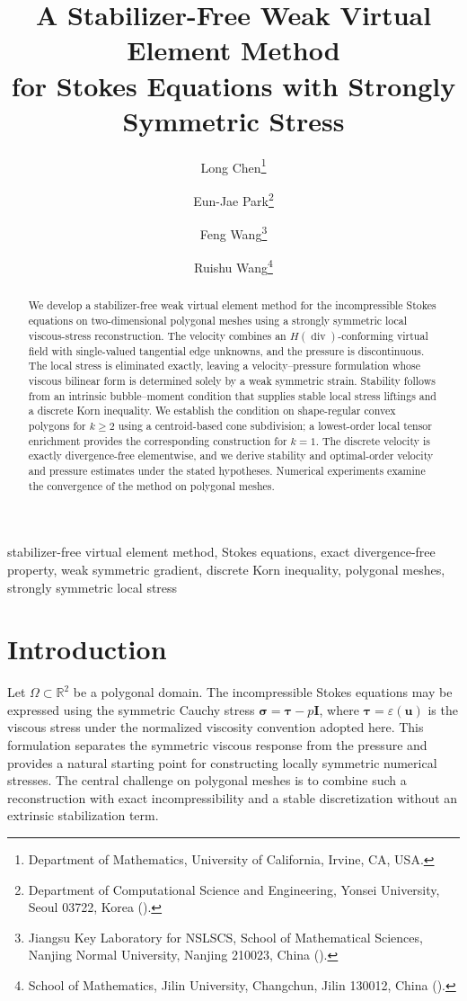 \documentclass[review,hidelinks,onefignum,onetabnum]{siamart251216}
\title{A Stabilizer-Free Weak Virtual Element Method\\
for Stokes Equations with Strongly Symmetric Stress}
\author{Long Chen\thanks{Department of Mathematics, University of California, Irvine, CA, USA.}
\and Eun-Jae Park\thanks{Department of Computational Science and Engineering,
           Yonsei University,
           Seoul 03722, Korea
  (\email{ejpark@yonsei.ac.kr}).}
\and Feng Wang\thanks{Jiangsu Key Laboratory for NSLSCS,
School of Mathematical Sciences, Nanjing Normal University,
Nanjing 210023, China
  (\email{fengwang@live.cn}).}
\and Ruishu Wang\thanks{School of Mathematics,
Jilin University,
Changchun, Jilin 130012, China
  (\email{wangrs\_math@jlu.edu.cn}).}
}
\begin{document}
\maketitle




\begin{abstract}
We develop a stabilizer-free weak virtual element method for the
incompressible Stokes equations on two-dimensional polygonal meshes using
a strongly symmetric local viscous-stress reconstruction. The velocity
combines an $H(\operatorname{div})$-conforming virtual field with
single-valued tangential edge unknowns, and the pressure is discontinuous.
The local stress is eliminated exactly, leaving a velocity--pressure
formulation whose viscous bilinear form is determined solely by a weak
symmetric strain. Stability follows from an intrinsic bubble--moment
condition that supplies stable local stress liftings and a discrete Korn
inequality. We establish the condition on shape-regular convex polygons
for $k\ge2$ using a centroid-based cone subdivision; a lowest-order
local tensor enrichment provides the corresponding construction for
$k=1$. The discrete velocity is exactly divergence-free elementwise,
and we derive stability and optimal-order velocity and pressure estimates
under the stated hypotheses. Numerical experiments examine the
convergence of the method on polygonal meshes.
\end{abstract}

\begin{keywords}
stabilizer-free virtual element method, Stokes equations, exact
divergence-free property, weak symmetric gradient, discrete Korn inequality,
polygonal meshes, strongly symmetric local stress
\end{keywords}


\section{Introduction}\label{sec:introduction}
Let $\Omega\subset\mathbb R^2$ be a polygonal domain. The
incompressible Stokes equations may be expressed using the symmetric
Cauchy stress $\boldsymbol\sigma=\boldsymbol\tau-p\boldsymbol I$,
where $\boldsymbol\tau=\varepsilon(\boldsymbol u)$ is the viscous
stress under the normalized viscosity convention adopted here.
This formulation separates the symmetric viscous response from the
pressure and provides a natural starting point for constructing locally
symmetric numerical stresses. The central challenge on polygonal meshes
is to combine such a reconstruction with exact incompressibility and a
stable discretization without an extrinsic stabilization term.
\end{document}
